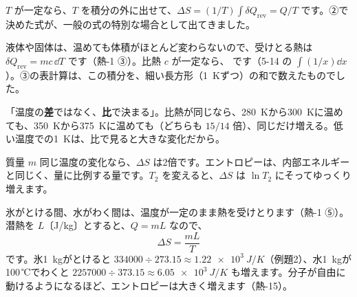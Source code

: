 $T$ が一定なら、$T$ を積分の外に出せて、$\Delta S=(1/T)\int\delta Q_{\mathrm{rev}}=Q/T$ です。②で決めた式が、一般の式の特別な場合として出てきました。

液体や固体は、温めても体積がほとんど変わらないので、受けとる熱は $\delta Q_{\mathrm{rev}}=mc\,\dd T$ です（熱-1 ③）。比熱 $c$ が一定なら、
です（5-14 の $\int(1/x)\dd x$）。③の表計算は、この積分を、細い長方形（\qty{1}{K}ずつ）の和で数えたものでした。

\begin{phyomi}[$\Delta S=mc\ln\dfrac{T_2}{T_1}$]
「温度の\textbf{差}ではなく、\textbf{比}で決まる」。比熱が同じなら、\qty{280}{K}から\qty{300}{K}に温めても、\qty{350}{K}から\qty{375}{K}に温めても（どちらも $15/14$ 倍）、同じだけ増える。低い温度での\qty{1}{K}は、比で見ると大きな変化だから。
\end{phyomi}

\begin{phbaisuru}{質量 $m$}
同じ温度の変化なら、$\Delta S$ は2倍です。エントロピーは、内部エネルギーと同じく、量に比例する量です。$T_2$ を変えると、$\Delta S$ は $\ln T_2$ にそってゆっくり増えます。
\par\smallskip\noindent{}
\end{phbaisuru}

氷がとける間、水がわく間は、温度が一定のまま熱を受けとります（熱-1 ⑤）。潜熱を $L$〔J/kg〕とすると、$Q=mL$ なので、
\[\Delta S=\frac{mL}{T}\]
です。氷\qty{1}{kg}がとけると $334000\div273.15\approx\qty{1.22e3}{J/K}$（例題2）、水\qty{1}{kg}が100\,℃でわくと $2257000\div373.15\approx\qty{6.05e3}{J/K}$ も増えます。分子が自由に動けるようになるほど、エントロピーは大きく増えます（熱-15）。

